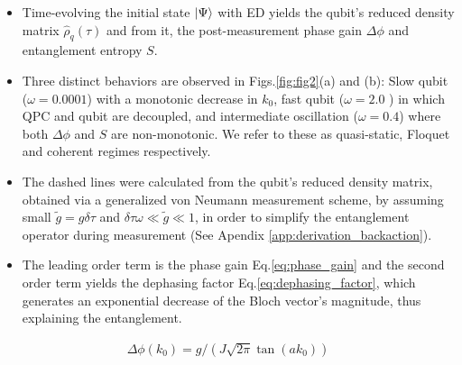 \documentclass[10pt,
 amsmath,amssymb,
 aps,prb, twocolumn
]{revtex4-2}
\begin{document}
\begin{itemize}
    \item Time-evolving the initial state $\ket{\Psi}$ with ED yields the qubit's reduced density matrix $\hat{\rho}_q(\tau)$ and from it, the post-measurement phase gain $\Delta \phi$ and entanglement entropy $S$. 

    \item Three distinct behaviors are observed in Figs.\ref{fig:fig2}(a) and (b): Slow qubit ($\omega = 0.0001$) with a monotonic decrease in $k_0$, fast qubit ($\omega = 2.0$ ) in which QPC and qubit are decoupled, and intermediate oscillation ($\omega = 0.4$) where both $\Delta \phi$ and $S$ are non-monotonic. We refer to these as quasi-static, Floquet and coherent regimes respectively.

    
    \item The dashed lines were calculated from the qubit's reduced density matrix, obtained via a generalized von Neumann measurement scheme\cite{siddiqi2024}, by assuming small $\tilde{g} = g\delta \tau$ and $\delta \tau \omega \ll \tilde{g}\ll 1 $, in order to simplify the entanglement operator during measurement (See Apendix \ref{app:derivation_backaction}).

    \item The leading order term is the phase gain Eq.\eqref{eq:phase_gain} and the second order term yields the dephasing factor Eq.\eqref{eq:dephasing_factor}, which generates an exponential decrease of the Bloch vector's magnitude, thus explaining the entanglement. 
\end{itemize}


\begin{align}\label{eq:phase_gain}
    \Delta \phi (k_0)= g/(J\sqrt{2\pi}\tan{(ak_0)}) 
\end{align}
\end{document}
